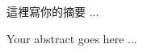 \begin{abstractzh}
這裡寫你的摘要 ...
\end{abstractzh}

\begin{abstracten}
Your abstract goes here ...
\end{abstracten}
